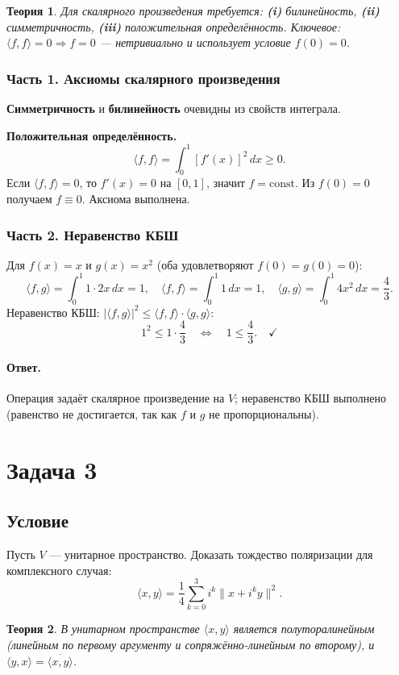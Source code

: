 \documentclass[12pt,a4paper]{article}
\theoremstyle{solution}
\newtheorem*{theory}{Теория}
\newcommand{\task}[1]{\newpage\section*{Задача #1}}
\newcommand{\answer}{\paragraph{Ответ.}}
\begin{document}
\begin{theory}
Для скалярного произведения требуется: \textbf{(i)} билинейность, \textbf{(ii)} симметричность, \textbf{(iii)} положительная определённость. Ключевое: $\langle f,f\rangle=0 \Rightarrow f=0$ — нетривиально и использует условие $f(0)=0$.
\end{theory}

\subsubsection*{Часть 1. Аксиомы скалярного произведения}

\textbf{Симметричность} и \textbf{билинейность} очевидны из свойств интеграла.

\textbf{Положительная определённость.}
\[
\langle f,f\rangle=\int_0^1[f'(x)]^2\,dx\geq 0.
\]
Если $\langle f,f\rangle=0$, то $f'(x)=0$ на $[0,1]$, значит $f=\mathrm{const}$. Из $f(0)=0$ получаем $f\equiv 0$. Аксиома выполнена.

\subsubsection*{Часть 2. Неравенство КБШ}

Для $f(x)=x$ и $g(x)=x^2$ (оба удовлетворяют $f(0)=g(0)=0$):
\[
\langle f,g\rangle=\int_0^1 1\cdot 2x\,dx=1,\quad
\langle f,f\rangle=\int_0^1 1\,dx=1,\quad
\langle g,g\rangle=\int_0^1 4x^2\,dx=\frac{4}{3}.
\]
Неравенство КБШ: $|\langle f,g\rangle|^2\leq\langle f,f\rangle\cdot\langle g,g\rangle$:
\[
1^2\leq 1\cdot\frac{4}{3}\quad\Leftrightarrow\quad 1\leq\frac{4}{3}.\quad\checkmark
\]

\answer Операция задаёт скалярное произведение на $V$; неравенство КБШ выполнено (равенство не достигается, так как $f$ и $g$ не пропорциональны).

\task{3}
\subsection*{Условие}
Пусть $V$ --- унитарное пространство. Доказать тождество поляризации для комплексного случая:
\[
\langle x,y\rangle=\frac{1}{4}\sum_{k=0}^{3}i^k\|x+i^ky\|^2.
\]

\begin{theory}
В унитарном пространстве $\langle x,y\rangle$ является полуторалинейным (линейным по первому аргументу и сопряжённо-линейным по второму), и $\langle y,x\rangle=\overline{\langle x,y\rangle}$.
\end{theory}
\end{document}
